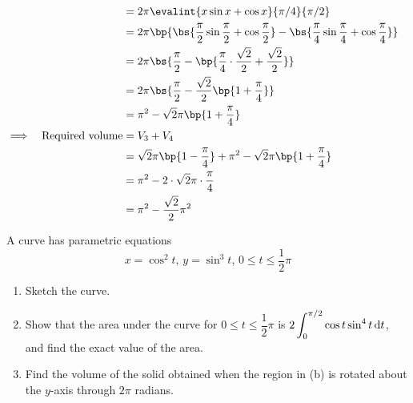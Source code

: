 \documentclass{echw}
\begin{document}
{\begin{alignat*}{2}
\begin{array}{r c @{\hspace*{1.0cm}} c}
                \end{array}\\\\
                && &= 2\pi \evalint{x\sin x + \cos x}{\pi/4}{\pi/2}\\
                && &= 2\pi \bp{\bs{\dfrac\pi2 \sin \dfrac\pi2 + \cos\dfrac\pi2} - \bs{\dfrac\pi4\sin\dfrac\pi4 + \cos\dfrac\pi4}}\\
                && &= 2\pi \bs{\dfrac\pi2 - \bp{\dfrac\pi4 \cdot \dfrac{\sqrt2}2 + \dfrac{\sqrt2}2}}\\
                && &= 2\pi \bs{\dfrac\pi2 - \dfrac{\sqrt2}2 \bp{1 + \dfrac\pi4}}\\
                && &= \pi^2 - \sqrt2 \pi \bp{1 + \dfrac\pi4}\\
                \implies&&\text{Required volume} &= V_3 + V_4\\
                && &= \sqrt2 \pi \bp{1 - \dfrac\pi4} + \pi^2 - \sqrt2 \pi \bp{1 + \dfrac\pi4}\\
                && &= \pi^2 - 2 \cdot \sqrt2 \pi \cdot \dfrac\pi4\\
                && &= \pi^2 - \dfrac{\sqrt2}2 \pi^2
            \end{alignat*}}

    \problem{}
        A curve has parametric equations
        \[
            x = \cos^2 t, \, y = \sin^3 t, \, 0 \leq t \leq \dfrac12 \pi
        \]
        
        \begin{enumerate}
            \item Sketch the curve.
            \item Show that the area under the curve for $0 \leq t \leq \dfrac12 \pi$ is $2\displaystyle\int_0^{\pi/2} \cos t \sin^4 t \mathop{\mathrm{d}t}$, and find the exact value of the area.
            \item Find the volume of the solid obtained when the region in (b) is rotated about the $y$-axis through $2\pi$ radians.
        \end{enumerate}

    \solution
\end{document}
